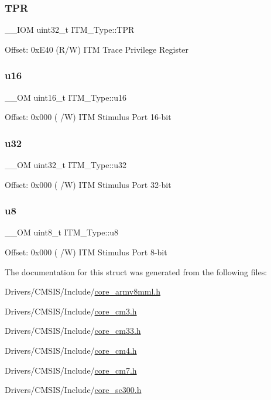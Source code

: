 \subsubsection{\texorpdfstring{T\+PR}{TPR}}
{\footnotesize\ttfamily \+\_\+\+\_\+\+I\+OM uint32\+\_\+t I\+T\+M\+\_\+\+Type\+::\+T\+PR}

Offset\+: 0x\+E40 (R/W) I\+TM Trace Privilege Register \mbox{\label{struct_i_t_m___type_a962a970dfd286cad7f8a8577e87d4ad3}} 
\subsubsection{\texorpdfstring{u16}{u16}}
{\footnotesize\ttfamily \+\_\+\+\_\+\+OM uint16\+\_\+t I\+T\+M\+\_\+\+Type\+::u16}

Offset\+: 0x000 ( /W) I\+TM Stimulus Port 16-\/bit \mbox{\label{struct_i_t_m___type_a5834885903a557674f078f3b71fa8bc8}} 
\subsubsection{\texorpdfstring{u32}{u32}}
{\footnotesize\ttfamily \+\_\+\+\_\+\+OM uint32\+\_\+t I\+T\+M\+\_\+\+Type\+::u32}

Offset\+: 0x000 ( /W) I\+TM Stimulus Port 32-\/bit \mbox{\label{struct_i_t_m___type_ae773bf9f9dac64e6c28b14aa39f74275}} 
\subsubsection{\texorpdfstring{u8}{u8}}
{\footnotesize\ttfamily \+\_\+\+\_\+\+OM uint8\+\_\+t I\+T\+M\+\_\+\+Type\+::u8}

Offset\+: 0x000 ( /W) I\+TM Stimulus Port 8-\/bit 

The documentation for this struct was generated from the following files\+:\begin{DoxyCompactItemize}
\item 
Drivers/\+C\+M\+S\+I\+S/\+Include/\hyperlink{core__armv8mml_8h}{core\+\_\+armv8mml.\+h}\item 
Drivers/\+C\+M\+S\+I\+S/\+Include/\hyperlink{core__cm3_8h}{core\+\_\+cm3.\+h}\item 
Drivers/\+C\+M\+S\+I\+S/\+Include/\hyperlink{core__cm33_8h}{core\+\_\+cm33.\+h}\item 
Drivers/\+C\+M\+S\+I\+S/\+Include/\hyperlink{core__cm4_8h}{core\+\_\+cm4.\+h}\item 
Drivers/\+C\+M\+S\+I\+S/\+Include/\hyperlink{core__cm7_8h}{core\+\_\+cm7.\+h}\item 
Drivers/\+C\+M\+S\+I\+S/\+Include/\hyperlink{core__sc300_8h}{core\+\_\+sc300.\+h}\end{DoxyCompactItemize}
